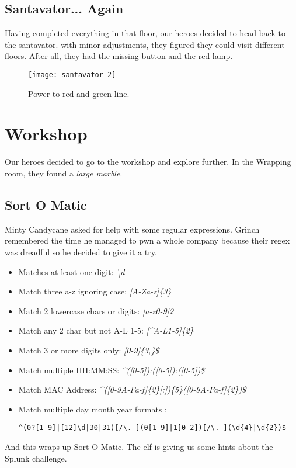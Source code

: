 \subsection{Santavator... Again}
Having completed everything in that floor, our heroes decided to head back to the santavator. with minor adjustments, they figured they could visit different floors. After all, they had the missing button and the red lamp.
\begin{figure}[h!]
  \texttt{[image: santavator-2]}
  \caption{Power to red and green line.}
\end{figure}

\section{Workshop}
Our heroes decided to go to the workshop and explore further.
In the Wrapping room, they found a \textit{large marble}.

\subsection{Sort O Matic}
{\color{codegreen}Minty Candycane} asked for help with some regular expressions. Grinch remembered the time he managed to pwn a whole company because their regex was dreadful so he decided to give it a try.
\begin{itemize}
  \item Matches at least one digit: \textit{\textbackslash d}
  \item Match three a-z ignoring case: \textit{[A-Za-z]\{3\}}
  \item Match 2 lowercase chars or digits: \textit{[a-z0-9]{2}}
  \item Match any 2 char but not A-L 1-5: \textit{[\^{}A-L1-5]\{2\}}
  \item Match 3 or more digits only: \textit{[0-9]\{3,\}\$}
  \item Match multiple HH:MM:SS: \textit{\^{}([0-5]\d):([0-5]\d):([0-5]\d)\$}
  \item Match MAC Address: \textit{\^{}([0-9A-Fa-f]\{2\}[:])\{5\}([0-9A-Fa-f]\{2\})\$}
  \item Match multiple day month year formats : \begin{Verbatim}[fontsize=\small,frame=single]
^(0?[1-9]|[12]\d|30|31)[/\.-](0[1-9]|1[0-2])[/\.-](\d{4}|\d{2})$
\end{Verbatim}
\end{itemize}

And this wraps up Sort-O-Matic. The elf is giving us some hints about the Splunk challenge.

